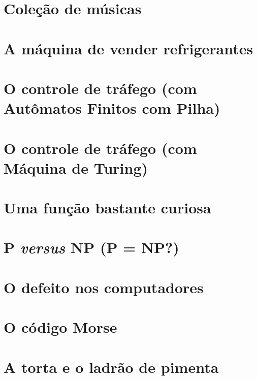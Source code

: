 \acresetall
\label{cap-problemas-textos}
\section{Coleção de músicas}

\newpage
\section{A máquina de vender refrigerantes}

\newpage
\section{O controle de tráfego (com Autômatos Finitos com Pilha)}
\newpage
\section{O controle de tráfego (com Máquina de Turing)}
\newpage
\section{Uma função bastante curiosa}

\newpage
\section{P \textit{versus} NP (P = NP?)}

\newpage
\section{O defeito nos computadores}

\newpage
\section{O código Morse}

\newpage
\section{A torta e o ladrão de pimenta}

